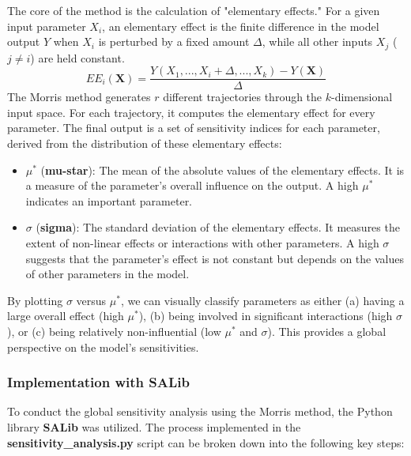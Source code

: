 \noindent
The core of the method is the calculation of "elementary effects." For a given input parameter $X_i$, an elementary effect is the finite difference in the model output $Y$ when $X_i$ is perturbed by a fixed amount $\Delta$, while all other inputs $X_j$ ($j \neq i$) are held constant.
\begin{equation}
    EE_i(\mathbf{X}) = \frac{Y(X_1, ..., X_i + \Delta, ..., X_k) - Y(\mathbf{X})}{\Delta}
\end{equation}
\noindent
The Morris method generates $r$ different trajectories through the $k$-dimensional input space. For each trajectory, it computes the elementary effect for every parameter. The final output is a set of sensitivity indices for each parameter, derived from the distribution of these elementary effects:
\begin{itemize}
    \item $\mu^*$ (\textbf{mu-star}): The mean of the absolute values of the elementary effects. It is a measure of the parameter's overall influence on the output. A high $\mu^*$ indicates an important parameter.
    \item $\sigma$ (\textbf{sigma}): The standard deviation of the elementary effects. It measures the extent of non-linear effects or interactions with other parameters. A high $\sigma$ suggests that the parameter's effect is not constant but depends on the values of other parameters in the model.
\end{itemize}
\noindent
By plotting $\sigma$ versus $\mu^*$, we can visually classify parameters as either (a) having a large overall effect (high $\mu^*$), (b) being involved in significant interactions (high $\sigma$), or (c) being relatively non-influential (low $\mu^*$ and $\sigma$). This provides a global perspective on the model's sensitivities.

\subsubsection{Implementation with SALib}
To conduct the global sensitivity analysis using the Morris method, the Python library \textbf{SALib} was utilized. The process implemented in the
\\
\noindent
 \textbf{sensitivity\_analysis.py} script can be broken down into the following key steps:

